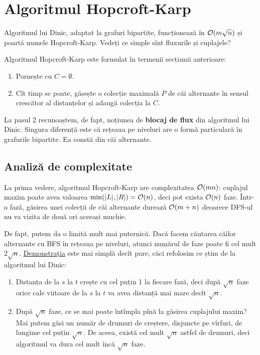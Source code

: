\documentclass[../main.tex]{subfiles}
\begin{document}
\section{Algoritmul Hopcroft-Karp}

Algoritmul lui Dinic, adaptat la grafuri bipartite, funcționează în $\mathcal{O}(m \sqrt{n})$ și poartă numele Hopcroft-Karp. Vedeți ce simple sînt fluxurile și cuplajele? 

Algoritmul Hopcroft-Karp este formulat în termenii secțiunii anterioare:

\begin{enumerate}
  \item Pornește cu $C = \emptyset$.
  \item Cît timp se poate, găsește o colecție maximală $P$ de căi alternante în sensul crescător al distanțelor și adaugă colecția la $C$.
\end{enumerate}

La pasul 2 recunoaștem, de fapt, noțiunea de \textbf{blocaj de flux} din algoritmul lui Dinic. Singura diferență este că rețeaua pe niveluri are o formă particulară în grafurile bipartite. Ea constă din căi alternante.

\subsection{Analiză de complexitate}

La prima vedere, algoritmul Hopcroft-Karp are complexitatea $\mathcal{O}(mn)$: cuplajul maxim poate avea valoarea $\min(|L|, |R|) = \mathcal{O}(n)$, deci pot exista $\mathcal{O}(n)$ faze. Într-o fază, găsirea unei colecții de căi alternante durează $\mathcal{O}(m + n)$ deoarece DFS-ul nu va vizita de două ori aceeași muchie.

De fapt, putem da o limită mult mai puternică. Dacă facem căutarea căilor alternante cu BFS în rețeaua pe niveluri, atunci numărul de faze poate fi cel mult $2 \sqrt{n}$. \href{https://en.wikipedia.org/wiki/Hopcroft\%E2\%80\%93Karp_algorithm#Analysis}{Demonstrația} este mai simplă decît pare, căci refolosim ce știm de la algoritmul lui Dinic:

\begin{enumerate}
  \item Distanța de la $s$ la $t$ crește cu cel puțin 1 la fiecare fază, deci după $\sqrt{n}$ faze orice cale viitoare de la $s$ la $t$ va avea distanță mai mare decît $\sqrt{n}$.

  \item După $\sqrt{n}$ faze, ce se mai poate întîmpla pînă la găsirea cuplajului maxim? Mai putem găsi un număr de drumuri de creștere, disjuncte pe vîrfuri, de lungime cel puțin $\sqrt{n}$. De aceea, există cel mult $\sqrt{n}$ astfel de drumuri, deci algoritmul va dura cel mult încă $\sqrt{n}$ faze.
\end{enumerate}
\end{document}
